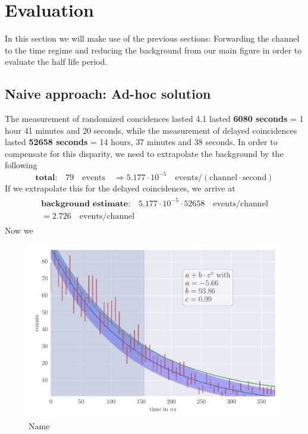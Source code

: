 \section{Evaluation}
In this section we will make use of the previous sections: Forwarding the channel to the time regime and
reducing the background from our main figure in order to evaluate the half life period.
\subsection{Naive approach: Ad-hoc solution}
The measurement of randomized concidences lasted 4.1 lasted \textbf{6080 seconds} = 1 hour 41 minutes and 20 seconds, while
the measurement of delayed coincidences lasted \textbf{52658 seconds} =  14 hours, 37 minutes and 38 seconds. 
In order to compensate for this disparity, we need to extrapolate the background by the following
\begin{equation}
\mathrm{\textbf{total:} } \quad 79 \quad \mathrm{events} \quad \Rightarrow 5.177\cdot 10^{-5}\quad \mathrm{events/ (channel \cdot second)}
\end{equation}
If we extrapolate this for the delayed coincidences, we arrive at
\begin{align}
\begin{split}
\mathrm{\textbf{background estimate:} } \quad  5.177\cdot 10^{-5} \cdot 52658 \quad \mathrm{events / channel} \\
= 2.726\quad \mathrm{events/ channel}
\end{split}
\end{align}
Now we 

\begin{figure}[htpb]
    \centering
    \includegraphics[width=0.8\linewidth]{analysis/figures/plot4_1_reg}
    \caption{Name}
    \label{fig:name}
\end{figure}




